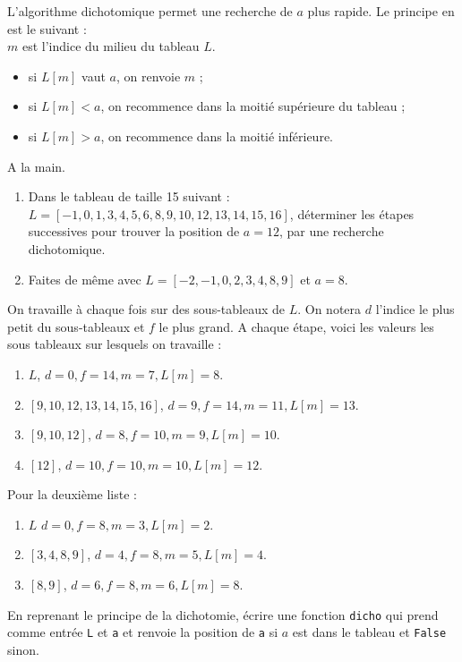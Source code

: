 L'algorithme dichotomique permet une recherche de $a$ plus rapide. Le principe en est le suivant :\\
$m$ est l'indice du milieu du tableau $L$.
\begin{itemize}
\item si $L[m]$ vaut $a$, on renvoie $m$ ;
\item si $L[m]<a$, on recommence dans la moitié supérieure du tableau ;
\item si $L[m]>a$, on recommence dans la moitié inférieure.
\end{itemize}


\begin{exercice}A la main.
\begin{enumerate}
\item Dans le tableau de taille 15 suivant : $L=[-1,0,1,3,4,5,6,8,9,10,12,13,14,15,16]$, déterminer les étapes successives pour trouver la position de $a=12$, par une recherche dichotomique.
\item Faites de même avec $L=[-2,-1,0,2,3,4,8,9]$ et $a=8$.
\end{enumerate}
\end{exercice}

\begin{solution}
On travaille à chaque fois sur des sous-tableaux de $L$. On notera $d$ l'indice le plus petit du sous-tableaux et $f$ le plus grand. A chaque étape, voici les valeurs les sous tableaux sur lesquels on travaille :
\begin{enumerate}
\item $L$, $d=0,f=14,m=7,L[m]=8$.
\item $[9,10,12,13,14,15,16]$, $d=9,f=14,m=11,L[m]=13$.
\item $[9,10,12]$, $d=8,f=10,m=9,L[m]=10$.
\item $[12]$, $d=10,f=10,m=10,L[m]=12$.
\end{enumerate}
Pour la deuxième liste : 
\begin{enumerate}
\item $L$ $d=0,f=8,m=3,L[m]=2$.
\item $[3,4,8,9]$, $d=4,f=8,m=5,L[m]=4$.
\item $[8,9]$, $d=6,f=8,m=6,L[m]=8$.
\end{enumerate}
\end{solution}


\begin{exercice}
En reprenant le principe de la dichotomie, écrire une fonction \verb?dicho? qui prend comme entrée \verb?L? et \verb?a? et renvoie la position de \verb?a? si $a$ est dans le tableau et \verb?False? sinon.
\end{exercice}

